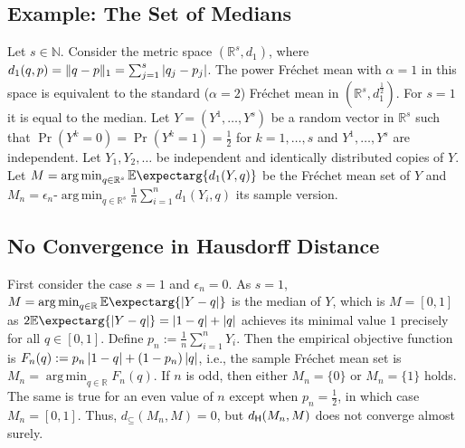 \documentclass{scrartcl}
\renewcommand{\subset}{\subseteq}
\newcommand{\Ex}{\E\expectarg}
\newcommand{\N}{\mathbb{N}}
\newcommand{\R}{\mathbb{R}}
\newcommand{\normof}[1]{\Vert #1 \Vert}
\DeclareMathOperator*{\argmin}{arg\,min}
\theoremstyle{plain}\newtheorem{theorem}{Theorem}[section]
\theoremstyle{definition}
\theoremstyle{remark}
\begin{document}
 \begin{appendix}
\section{Example: The Set of Medians}\label{sec:median}
Let $s\in\N$. Consider the metric space $(\R^s, d_1)$, where $d_1(q,p) = \normof{q-p}_1 = \sum_{j=1}^s \abs{q_j-p_j}$. The power Fréchet mean with $\alpha=1$ in this space is equivalent to the standard ($\alpha=2$) Fréchet mean in $(\R^s, d_1^{\frac{1}{2}})$. For $s=1$ it is equal to the median.
Let $Y = (Y^1,\dots, Y^s)$ be a random vector in $\R^s$ such that $\Pr(Y^k=0)=\Pr(Y^k=1)=\frac{1}{2}$ for $k=1,\dots, s$ and $Y^1,\dots, Y^s$ are independent. Let $Y_1, Y_2,\dots$ be independent and identically distributed copies of $Y$. Let $M = \argmin_{q\in\R^s}\Ex{d_1(Y, q)}$ be the Fréchet mean set of $Y$ and $M_n = \epsilon_n\text{-}\argmin_{q\in\R^s}\frac{1}n\sum_{i=1}^n d_1(Y_i, q)$ its sample version.

\subsection{No Convergence in Hausdorff Distance}
First consider the case $s=1$ and $\epsilon_n=0$.
As $s=1$,  $M = \argmin_{q\in\R} \Ex{\abs{Y-q}}$ is the median of $Y$, which is $M = [0,1]$ as $2\Ex{\abs{Y-q}} = \abs{1-q}+\abs{q}$ achieves its minimal value $1$ precisely for all $q\in[0,1]$.
Define $p_n := \frac{1}n \sum_{i=1}^n Y_i$. Then the empirical objective function is $F_n(q) := p_n\left| 1-q \right|+(1-p_n)\left| q \right|$, i.e., the sample Fréchet mean set is $M_n = \argmin_{q\in\R} F_n(q)$.
If $n$ is odd, then either $M_n = \{0\}$ or $M_n = \{1\}$ holds. The same is true for an even value of $n$ except when $p_n=\frac{1}{2}$, in which case $M_n=[0,1]$.
Thus, $d_{\subset}(M_n, M) = 0$, but $d_{\mathsf{H}}(M_n, M)$ does not converge almost surely.


\end{appendix}
\end{document}
